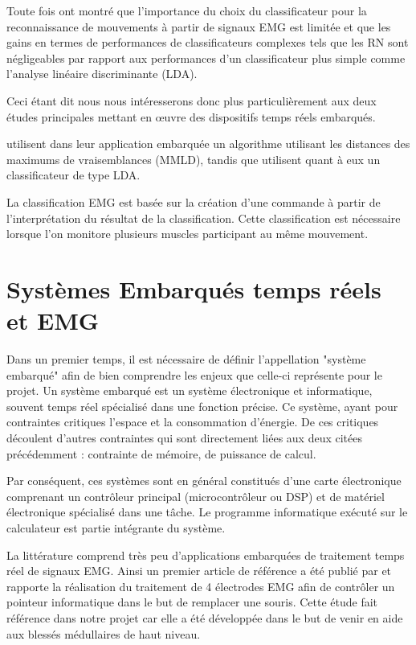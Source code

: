 \documentclass[letterpaper, twoside, 12pt, memoire, creativecommons, hyperref]{thETS}
\begin{document}
Toute fois \cite{englehart1999} ont montré que l'importance du choix du classificateur pour la reconnaissance de mouvements à partir de signaux EMG est limitée et que les gains en termes de performances de classificateurs complexes tels que les RN sont négligeables par rapport aux performances d'un classificateur plus simple comme l'analyse linéaire discriminante (LDA).

Ceci étant dit nous nous intéresserons donc plus particulièrement aux deux études principales mettant en œuvre des dispositifs temps réels embarqués.

\cite{Chang1996} utilisent dans leur application embarquée un algorithme utilisant les distances des maximums de vraisemblances (MMLD), tandis que \cite{Tenore2007} utilisent quant à eux un classificateur de type LDA.

La classification EMG est basée sur la création d'une commande à partir de l'interprétation du résultat de la classification. Cette classification est nécessaire lorsque l'on monitore plusieurs muscles participant au même mouvement. 


\section{Systèmes Embarqués temps réels et EMG}

Dans un premier temps, il est nécessaire de définir l'appellation "système embarqué" afin de bien comprendre les enjeux que celle-ci représente pour le projet. Un système embarqué est un système électronique et informatique, souvent temps réel spécialisé dans une fonction précise. Ce système, ayant pour contraintes critiques l'espace et la consommation d'énergie. De ces critiques découlent d'autres contraintes qui sont directement liées aux deux citées précédemment : contrainte de mémoire, de puissance de calcul.

Par conséquent, ces systèmes sont en général constitués d'une carte électronique comprenant un contrôleur principal (microcontrôleur ou DSP) et de matériel électronique spécialisé dans une tâche. Le programme informatique exécuté sur le calculateur est partie intégrante du système.

La littérature comprend très peu d'applications embarquées de traitement temps réel de signaux EMG. Ainsi un premier article de référence a été publié par \cite{Chang1996} et rapporte la réalisation du traitement de 4 électrodes EMG afin de contrôler un pointeur informatique dans le but de remplacer une souris. Cette étude fait référence dans notre projet car elle a été développée dans le but de venir en aide aux blessés médullaires de haut niveau. 
\end{document}
